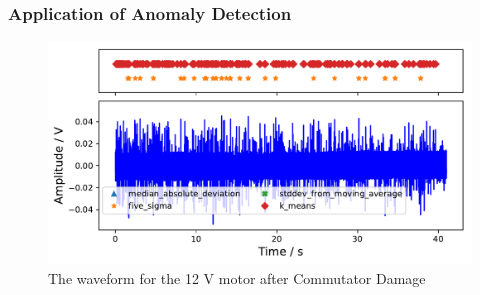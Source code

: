 \subsubsection{Application of Anomaly Detection}

\begin{figure}[t]
    \includegraphics[width=1.0\textwidth]{fig/12V_hammer_motornorm12V.pdf}
    \caption[Anomaly Tests 12 V Commutator Damage]{The waveform for the 12 V motor after Commutator Damage}
    \label{fig:12V_Hammer}
\end{figure}



